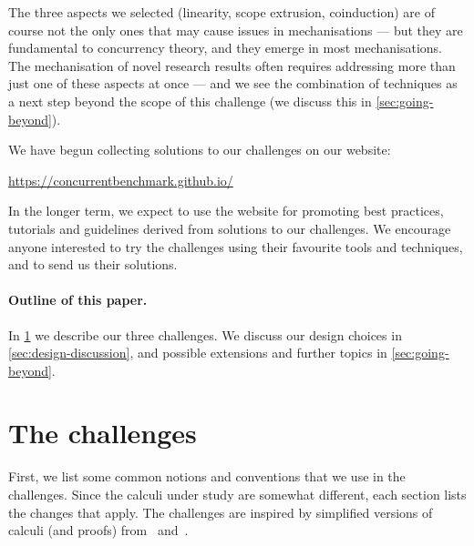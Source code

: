 \documentclass[runningheads]{llncs}
\begin{document}
The three aspects we selected (linearity, scope extrusion, coinduction) are of
course not the only ones that may cause issues in mechanisations --- but they
are fundamental to concurrency theory, and they emerge in most mechanisations.
The mechanisation of novel research results often requires addressing more than
just one of these aspects at once --- and we see the combination of techniques
as a next step beyond the scope of this challenge (we discuss this in
\cref{sec:going-beyond}).


We have begun collecting solutions to our challenges on our website:
%
\begin{center}
  \url{https://concurrentbenchmark.github.io/}
\end{center}
%
In the longer term, we expect to use the website for promoting best practices,
tutorials and guidelines derived from solutions to our challenges.
We encourage anyone interested to try the challenges using their
favourite tools and techniques, and to send us their solutions.

\paragraph{Outline of this paper.}
In \cref{sec:challenge-problems} we describe our three challenges.
We discuss our design choices in \cref{sec:design-discussion}, and possible extensions and further topics in \cref{sec:going-beyond}.

\section{The challenges}\label{sec:challenge-problems}
\label{sec:prelim}
First, we list some common notions and conventions that we use in the
challenges. Since the calculi under study are somewhat different, each section
lists the changes that apply. The challenges are inspired by simplified versions of calculi (and proofs) from~\cite{picalcbook} and~\cite{Vasconcelos2012}.
\end{document}
